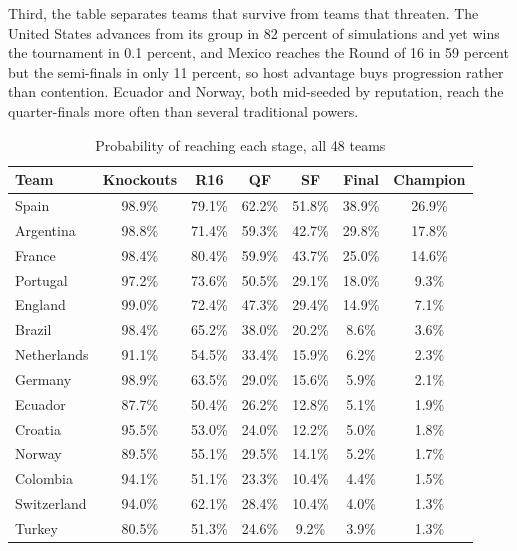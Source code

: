 \documentclass[11pt,letterpaper]{article}
\begin{document}
Third, the table separates teams that survive from teams that threaten. The United States advances from its group in 82 percent of simulations and yet wins the tournament in 0.1 percent, and Mexico reaches the Round of 16 in 59 percent but the semi-finals in only 11 percent, so host advantage buys progression rather than contention. Ecuador and Norway, both mid-seeded by reputation, reach the quarter-finals more often than several traditional powers.

\begin{table}[p]
  \centering
  \caption{Probability of reaching each stage, all 48 teams}\label{tab:survival}
  \begin{small}
  \begin{threeparttable}
    {\begin{tabular*}{\textwidth}{@{\extracolsep{\fill}} lcccccc}
      \toprule
      Team & Knockouts & R16 & QF & SF & Final & Champion \\
      \midrule
Spain                  & 98.9\% & 79.1\% & 62.2\% & 51.8\% & 38.9\% & 26.9\% \\
Argentina              & 98.8\% & 71.4\% & 59.3\% & 42.7\% & 29.8\% & 17.8\% \\
France                 & 98.4\% & 80.4\% & 59.9\% & 43.7\% & 25.0\% & 14.6\% \\
Portugal               & 97.2\% & 73.6\% & 50.5\% & 29.1\% & 18.0\% &  9.3\% \\
England                & 99.0\% & 72.4\% & 47.3\% & 29.4\% & 14.9\% &  7.1\% \\
Brazil                 & 98.4\% & 65.2\% & 38.0\% & 20.2\% &  8.6\% &  3.6\% \\
Netherlands            & 91.1\% & 54.5\% & 33.4\% & 15.9\% &  6.2\% &  2.3\% \\
Germany                & 98.9\% & 63.5\% & 29.0\% & 15.6\% &  5.9\% &  2.1\% \\
Ecuador                & 87.7\% & 50.4\% & 26.2\% & 12.8\% &  5.1\% &  1.9\% \\
Croatia                & 95.5\% & 53.0\% & 24.0\% & 12.2\% &  5.0\% &  1.8\% \\
Norway                 & 89.5\% & 55.1\% & 29.5\% & 14.1\% &  5.2\% &  1.7\% \\
Colombia               & 94.1\% & 51.1\% & 23.3\% & 10.4\% &  4.4\% &  1.5\% \\
Switzerland            & 94.0\% & 62.1\% & 28.4\% & 10.4\% &  4.0\% &  1.3\% \\
Turkey                 & 80.5\% & 51.3\% & 24.6\% &  9.2\% &  3.9\% &  1.3\% \\

\end{tabular*}}
\end{threeparttable}
\end{small}
\end{table}
\end{document}
